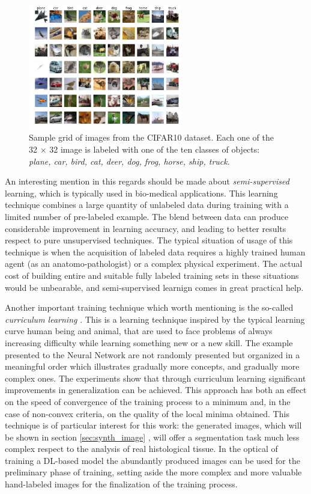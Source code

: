 \begin{figure}
    \centering
    \includegraphics[width = 0.6\textwidth]{images/cifar10}
    \caption{Sample grid of images from the CIFAR10 dataset. Each one of the 32 $\times$ 32 image is labeled with one of the ten classes of objects: \textit{plane, car, bird, cat, deer, dog, frog, horse, ship, truck}.}
    \label{fig:cf10}
\end{figure}

An interesting mention in this regards should be made about \textit{semi-supervised} learning, which is typically used in bio-medical applications. This learning technique combines a large quantity of unlabeled data during training with a limited number of pre-labeled example. The blend between data can produce considerable improvement in learning accuracy, and leading to better results respect to pure unsupervised techniques. The typical situation of usage of this technique is when the acquisition of labeled data requires a highly trained human agent (as an anatomo-pathologist) or a complex physical experiment. The actual cost of building entire and suitable fully labeled training sets in these situations would be unbearable, and semi-supervised learnign comes in great practical help.

Another important training technique which worth mentioning is the so-called \textit{curriculum learning} \cite{10.1145/1553374.1553380}. This is a learning technique inspired by the typical learning curve human being and animal, that are used to face problems of always increasing difficulty while learning something new or a new skill. The example presented to the Neural Network are not randomly presented but organized in a meaningful order which illustrates gradually more concepts, and gradually more complex ones. The experiments show that through curriculum learning significant improvements in generalization can be achieved. This approach has both an effect on the speed of convergence of the training process to a minimum and, in the case of non-convex criteria, on the quality of the local minima obtained. This technique is of particular interest for this work: the generated images, which will be shown in section \ref{sec:synth_image} , will offer a segmentation task much less complex respect to the analysis of real histological tissue. In the optical of training a DL-based model the abundantly produced images can be used for the preliminary phase of training, setting aside the more complex and more valuable hand-labeled images for the finalization of the training process.

